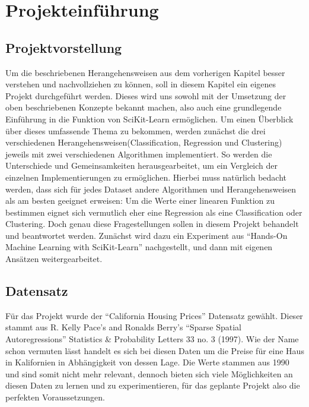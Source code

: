 \chapter{Projekteinführung}
\label{chap:projekteinführung}

\section{Projektvorstellung}
\label{sec:projektvorstellung}
Um die beschriebenen Herangehensweisen aus dem vorherigen Kapitel besser verstehen und nachvollziehen zu können, soll in diesem Kapitel ein eigenes Projekt durchgeführt werden. Dieses wird uns sowohl mit der Umsetzung der oben beschriebenen Konzepte bekannt machen, also auch eine grundlegende Einführung in die Funktion von SciKit-Learn ermöglichen. 
Um einen Überblick über dieses umfassende Thema zu bekommen, werden zunächst die drei verschiedenen Herangehensweisen(Classification, Regression und Clustering) jeweils mit zwei verschiedenen Algorithmen implementiert. So werden die Unterschiede und Gemeinsamkeiten herausgearbeitet, um ein Vergleich der einzelnen Implementierungen zu ermöglichen. Hierbei muss natürlich bedacht werden, dass sich für jedes Dataset andere Algorithmen und Herangehensweisen als am besten geeignet erweisen: Um die Werte einer linearen Funktion zu bestimmen eignet sich vermutlich eher eine Regression als eine Classification oder Clustering. Doch genau diese Fragestellungen sollen in diesem Projekt behandelt und beantwortet werden.
Zunächst wird dazu ein Experiment aus “Hands-On Machine Learning with SciKit-Learn” nachgestellt, und dann mit eigenen Ansätzen weitergearbeitet.

\section{Datensatz}
\label{sec:datensatz}
Für das Projekt wurde der “California Housing Prices” Datensatz gewählt. Dieser stammt aus R. Kelly Pace’s and Ronalds Berry’s “Sparse Spatial Autoregressions” Statistics \& Probability Letters 33 no. 3 (1997). Wie der Name schon vermuten lässt handelt es sich bei diesen Daten um die Preise für eine Haus in Kalifornien in Abhängigkeit von dessen Lage. Die Werte stammen aus 1990  und sind somit nicht mehr relevant, dennoch bieten sich viele Möglichkeiten an diesen Daten zu lernen und zu experimentieren, für das geplante Projekt also die perfekten Voraussetzungen.

